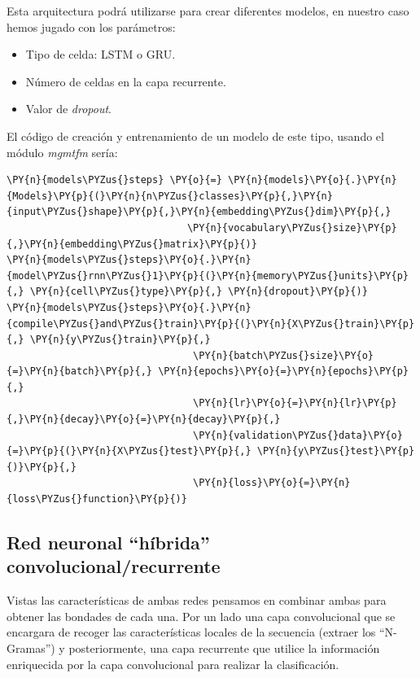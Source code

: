 Esta arquitectura podrá utilizarse para crear diferentes modelos, en nuestro caso hemos jugado con los parámetros: 

\begin{itemize}
\item Tipo de celda: LSTM o GRU. 
\item Número de celdas en la capa recurrente. 
\item Valor de \textit{dropout}.
\end{itemize}


El código de creación y entrenamiento de un modelo de este tipo, usando el módulo \textit{mgmtfm} sería: 
\vspace{0.5cm}
   
    \begin{tcolorbox}[breakable, size=fbox, boxrule=1pt, pad at break*=1mm,colback=cellbackground, colframe=cellborder]
\begin{Verbatim}[commandchars=\\\{\}]
\PY{n}{models\PYZus{}steps} \PY{o}{=} \PY{n}{models}\PY{o}{.}\PY{n}{Models}\PY{p}{(}\PY{n}{n\PYZus{}classes}\PY{p}{,}\PY{n}{input\PYZus{}shape}\PY{p}{,}\PY{n}{embedding\PYZus{}dim}\PY{p}{,}
                               \PY{n}{vocabulary\PYZus{}size}\PY{p}{,}\PY{n}{embedding\PYZus{}matrix}\PY{p}{)}
\PY{n}{models\PYZus{}steps}\PY{o}{.}\PY{n}{model\PYZus{}rnn\PYZus{}1}\PY{p}{(}\PY{n}{memory\PYZus{}units}\PY{p}{,} \PY{n}{cell\PYZus{}type}\PY{p}{,} \PY{n}{dropout}\PY{p}{)}
\PY{n}{models\PYZus{}steps}\PY{o}{.}\PY{n}{compile\PYZus{}and\PYZus{}train}\PY{p}{(}\PY{n}{X\PYZus{}train}\PY{p}{,} \PY{n}{y\PYZus{}train}\PY{p}{,}
                                \PY{n}{batch\PYZus{}size}\PY{o}{=}\PY{n}{batch}\PY{p}{,} \PY{n}{epochs}\PY{o}{=}\PY{n}{epochs}\PY{p}{,} 
                                \PY{n}{lr}\PY{o}{=}\PY{n}{lr}\PY{p}{,}\PY{n}{decay}\PY{o}{=}\PY{n}{decay}\PY{p}{,}
                                \PY{n}{validation\PYZus{}data}\PY{o}{=}\PY{p}{(}\PY{n}{X\PYZus{}test}\PY{p}{,} \PY{n}{y\PYZus{}test}\PY{p}{)}\PY{p}{,}
                                \PY{n}{loss}\PY{o}{=}\PY{n}{loss\PYZus{}function}\PY{p}{)} 
\end{Verbatim}
\end{tcolorbox}


\subsection{Red neuronal ``híbrida'' convolucional/recurrente}

Vistas las características de ambas redes pensamos en combinar ambas para obtener las bondades de cada una. Por un lado una capa convolucional que se encargara de recoger las características locales de la secuencia (extraer los ``N-Gramas'') y posteriormente, una capa recurrente que utilice la información enriquecida por la capa convolucional para realizar la clasificación.



